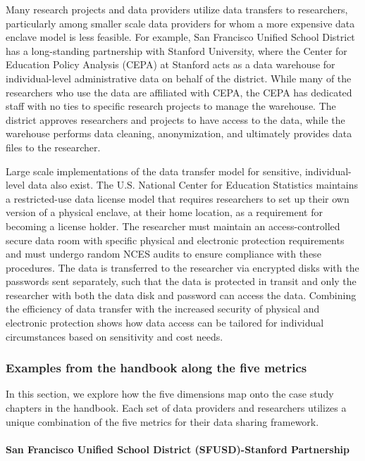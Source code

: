 Many research projects and data providers utilize data transfers to
researchers, particularly among smaller scale data providers for whom a
more expensive data enclave model is less feasible. For example, San
Francisco Unified School District has a long-standing partnership with
Stanford University, where the Center for Education Policy Analysis
(CEPA) at Stanford acts as a data warehouse for individual-level
administrative data on behalf of the district. While many of the
researchers who use the data are affiliated with CEPA, the CEPA has
dedicated staff with no ties to specific research projects to manage the
warehouse. The district approves researchers and projects to have access
to the data, while the warehouse performs data cleaning, anonymization,
and ultimately provides data files to the researcher.

Large scale implementations of the data transfer model for sensitive,
individual-level data also exist. The U.S. National Center for Education
Statistics maintains a restricted-use data license model that requires
researchers to set up their own version of a physical enclave, at their
home location, as a requirement for becoming a license holder. The
researcher must maintain an access-controlled secure data room with
specific physical and electronic protection requirements and must
undergo random NCES audits to ensure compliance with these procedures.
The data is transferred to the researcher via encrypted disks with the
passwords sent separately, such that the data is protected in transit
and only the researcher with both the data disk and password can access
the data. Combining the efficiency of data transfer with the increased
security of physical and electronic protection shows how data access can
be tailored for individual circumstances based on sensitivity and cost
needs.

\hypertarget{examples-from-the-handbook-along-the-five-metrics}{%
\subsubsection{Examples from the handbook along the five
metrics}\label{examples-from-the-handbook-along-the-five-metrics}}

In this section, we explore how the five dimensions map onto the case
study chapters in the handbook. Each set of data providers and
researchers utilizes a unique combination of the five metrics for their
data sharing framework.

\hypertarget{san-francisco-unified-school-district-sfusd-stanford-partnership}{%
\paragraph{San Francisco Unified School District (SFUSD)-Stanford
Partnership}\label{san-francisco-unified-school-district-sfusd-stanford-partnership}}

